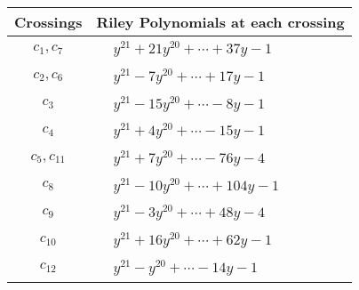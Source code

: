 \documentclass[1p]{elsarticle_modified}
\theoremstyle{definition}
\begin{document}
\begin{tabular}{m{50pt}|m{274pt}}
Crossings & \hspace{64pt}Riley Polynomials at each crossing \\
\hline $$\begin{aligned}c_{1},c_{7}\end{aligned}$$&$\begin{aligned}
&y^{21}+21 y^{20}+\cdots+37 y-1
\end{aligned}$\\
\hline $$\begin{aligned}c_{2},c_{6}\end{aligned}$$&$\begin{aligned}
&y^{21}-7 y^{20}+\cdots+17 y-1
\end{aligned}$\\
\hline $$\begin{aligned}c_{3}\end{aligned}$$&$\begin{aligned}
&y^{21}-15 y^{20}+\cdots-8 y-1
\end{aligned}$\\
\hline $$\begin{aligned}c_{4}\end{aligned}$$&$\begin{aligned}
&y^{21}+4 y^{20}+\cdots-15 y-1
\end{aligned}$\\
\hline $$\begin{aligned}c_{5},c_{11}\end{aligned}$$&$\begin{aligned}
&y^{21}+7 y^{20}+\cdots-76 y-4
\end{aligned}$\\
\hline $$\begin{aligned}c_{8}\end{aligned}$$&$\begin{aligned}
&y^{21}-10 y^{20}+\cdots+104 y-1
\end{aligned}$\\
\hline $$\begin{aligned}c_{9}\end{aligned}$$&$\begin{aligned}
&y^{21}-3 y^{20}+\cdots+48 y-4
\end{aligned}$\\
\hline $$\begin{aligned}c_{10}\end{aligned}$$&$\begin{aligned}
&y^{21}+16 y^{20}+\cdots+62 y-1
\end{aligned}$\\
\hline $$\begin{aligned}c_{12}\end{aligned}$$&$\begin{aligned}
&y^{21}- y^{20}+\cdots-14 y-1
\end{aligned}$\\
\hline
\end{tabular}\\~\\
\end{document}
